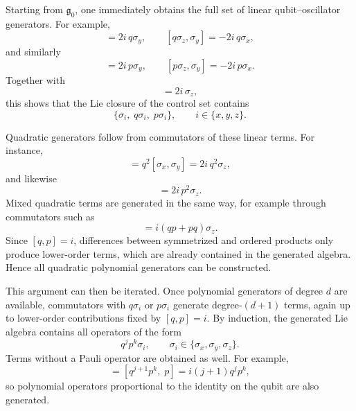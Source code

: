 Starting from \(\mathfrak{g}_0\), one immediately obtains the full set of linear qubit--oscillator generators. For example,
\begin{equation}
    [q\sigma_z,\sigma_x] = 2i\,q\sigma_y,
    \qquad
    [q\sigma_z,\sigma_y] = -2i\,q\sigma_x,
\end{equation}
and similarly
\begin{equation}
    [p\sigma_z,\sigma_x] = 2i\,p\sigma_y,
    \qquad
    [p\sigma_z,\sigma_y] = -2i\,p\sigma_x.
\end{equation}
Together with
\begin{equation}
    [\sigma_x,\sigma_y] = 2i\,\sigma_z,
\end{equation}
this shows that the Lie closure of the control set contains
\begin{equation}
    \{\sigma_i,\; q\sigma_i,\; p\sigma_i\},
    \qquad
    i\in\{x,y,z\}.
\end{equation}

Quadratic generators follow from commutators of these linear terms. For instance,
\begin{equation}
    [q\sigma_x,q\sigma_y]
    =
    q^2[\sigma_x,\sigma_y]
    =
    2i\,q^2\sigma_z,
\end{equation}
and likewise
\begin{equation}
    [p\sigma_x,p\sigma_y] = 2i\,p^2\sigma_z.
\end{equation}
Mixed quadratic terms are generated in the same way, for example through commutators such as
\begin{equation}
    [q\sigma_x,p\sigma_y]
    =
    i(qp+pq)\sigma_z.
\end{equation}
Since \([q,p]=i\), differences between symmetrized and ordered products only produce lower-order terms, which are already contained in the generated algebra. Hence all quadratic polynomial generators can be constructed.

This argument can then be iterated. Once polynomial generators of degree \(d\) are available, commutators with \(q\sigma_i\) or \(p\sigma_i\) generate degree-\((d+1)\) terms, again up to lower-order contributions fixed by \([q,p]=i\). By induction, the generated Lie algebra contains all operators of the form
\begin{equation}
    q^j p^k \sigma_i,
    \qquad
    \sigma_i\in\{\sigma_x,\sigma_y,\sigma_z\}.
\end{equation}
Terms without a Pauli operator are obtained as well. For example,
\begin{equation}
    [q^{j+1}p^k \sigma_z,\; p\sigma_z]
    =
    [q^{j+1}p^k,\; p]
    =
    i(j+1)q^j p^k,
\end{equation}
so polynomial operators proportional to the identity on the qubit are also generated.

